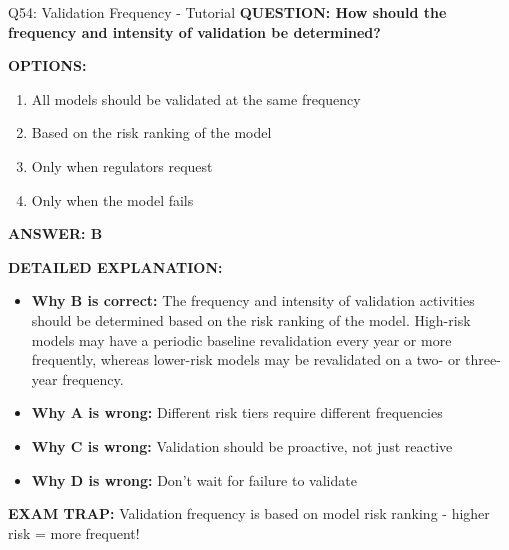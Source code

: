 \documentclass[8pt]{beamer}
\begin{document}
	\begin{frame}{Q54: Validation Frequency - Tutorial}
		\fontsize{6.5}{7.5}\selectfont
		\textbf{QUESTION: How should the frequency and intensity of validation be determined?}
		
		\vspace{0.1cm}
		\textbf{OPTIONS:}
		\begin{enumerate}
			\item All models should be validated at the same frequency
			\item Based on the risk ranking of the model
			\item Only when regulators request
			\item Only when the model fails
		\end{enumerate}
		
		\vspace{0.1cm}
		\textcolor{myblue}{\textbf{ANSWER: B}}
		
		\vspace{0.1cm}
		\textbf{DETAILED EXPLANATION:}
		\begin{itemize}
			\item \textbf{Why B is correct:} The frequency and intensity of validation activities should be determined based on the risk ranking of the model. High-risk models may have a periodic baseline revalidation every year or more frequently, whereas lower-risk models may be revalidated on a two- or three-year frequency.
			\item \textbf{Why A is wrong:} Different risk tiers require different frequencies
			\item \textbf{Why C is wrong:} Validation should be proactive, not just reactive
			\item \textbf{Why D is wrong:} Don't wait for failure to validate
		\end{itemize}
		
		\textcolor{myred}{\textbf{EXAM TRAP:}} Validation frequency is \textcolor{myblue}{based on model risk ranking} - higher risk = more frequent!
	\end{frame}
	
\end{document}
